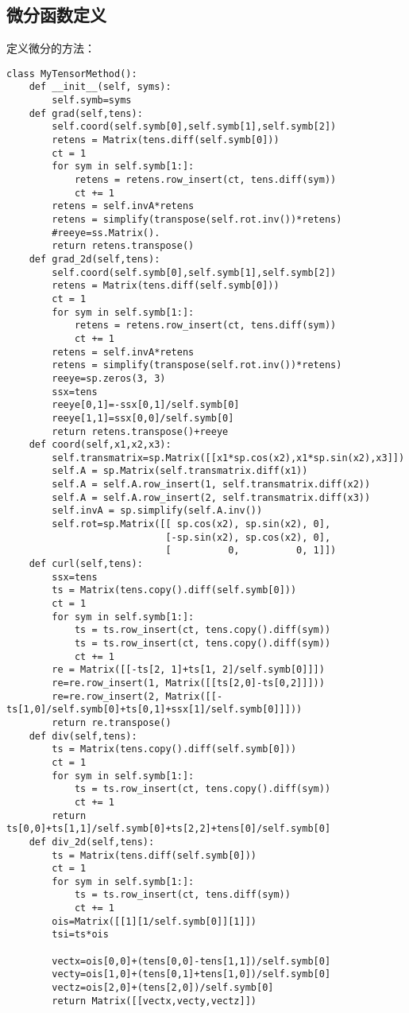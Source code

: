 \documentclass[UTF8]{article}
\begin{document}
        \subsection{微分函数定义}

定义微分的方法：
\begin{lstlisting}
class MyTensorMethod():
    def __init__(self, syms):
        self.symb=syms
    def grad(self,tens):
        self.coord(self.symb[0],self.symb[1],self.symb[2])
        retens = Matrix(tens.diff(self.symb[0]))
        ct = 1
        for sym in self.symb[1:]:
            retens = retens.row_insert(ct, tens.diff(sym))
            ct += 1
        retens = self.invA*retens
        retens = simplify(transpose(self.rot.inv())*retens)
        #reeye=ss.Matrix().
        return retens.transpose()
    def grad_2d(self,tens):
        self.coord(self.symb[0],self.symb[1],self.symb[2])
        retens = Matrix(tens.diff(self.symb[0]))
        ct = 1
        for sym in self.symb[1:]:
            retens = retens.row_insert(ct, tens.diff(sym))
            ct += 1
        retens = self.invA*retens
        retens = simplify(transpose(self.rot.inv())*retens)
        reeye=sp.zeros(3, 3)
        ssx=tens
        reeye[0,1]=-ssx[0,1]/self.symb[0]
        reeye[1,1]=ssx[0,0]/self.symb[0]
        return retens.transpose()+reeye
    def coord(self,x1,x2,x3):
        self.transmatrix=sp.Matrix([[x1*sp.cos(x2),x1*sp.sin(x2),x3]])
        self.A = sp.Matrix(self.transmatrix.diff(x1))
        self.A = self.A.row_insert(1, self.transmatrix.diff(x2))
        self.A = self.A.row_insert(2, self.transmatrix.diff(x3))
        self.invA = sp.simplify(self.A.inv())
        self.rot=sp.Matrix([[ sp.cos(x2), sp.sin(x2), 0],
                            [-sp.sin(x2), sp.cos(x2), 0],
                            [          0,          0, 1]])
    def curl(self,tens):
        ssx=tens
        ts = Matrix(tens.copy().diff(self.symb[0]))
        ct = 1
        for sym in self.symb[1:]:
            ts = ts.row_insert(ct, tens.copy().diff(sym))
            ts = ts.row_insert(ct, tens.copy().diff(sym))
            ct += 1
        re = Matrix([[-ts[2, 1]+ts[1, 2]/self.symb[0]]])
        re=re.row_insert(1, Matrix([[ts[2,0]-ts[0,2]]]))
        re=re.row_insert(2, Matrix([[-ts[1,0]/self.symb[0]+ts[0,1]+ssx[1]/self.symb[0]]]))
        return re.transpose()
    def div(self,tens):
        ts = Matrix(tens.copy().diff(self.symb[0]))
        ct = 1
        for sym in self.symb[1:]:
            ts = ts.row_insert(ct, tens.copy().diff(sym))
            ct += 1
        return ts[0,0]+ts[1,1]/self.symb[0]+ts[2,2]+tens[0]/self.symb[0]
    def div_2d(self,tens):
        ts = Matrix(tens.diff(self.symb[0]))
        ct = 1
        for sym in self.symb[1:]:
            ts = ts.row_insert(ct, tens.diff(sym))
            ct += 1
        ois=Matrix([[1][1/self.symb[0]][1]])
        tsi=ts*ois

        vectx=ois[0,0]+(tens[0,0]-tens[1,1])/self.symb[0]
        vecty=ois[1,0]+(tens[0,1]+tens[1,0])/self.symb[0]
        vectz=ois[2,0]+(tens[2,0])/self.symb[0]
        return Matrix([[vectx,vecty,vectz]])

\end{lstlisting}
\end{document}
